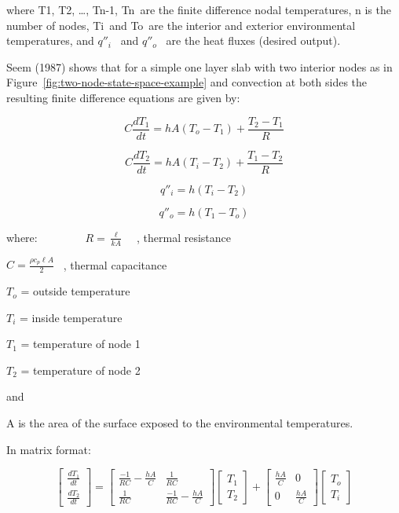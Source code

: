 where T1, T2, \ldots{}, Tn-1, Tn~are the finite difference nodal temperatures, n is the number of nodes, Ti~and To~are the interior and exterior environmental temperatures, and \({q''_i}\) ~and \({q''_o}\) ~are the heat fluxes (desired output).

Seem (1987) shows that for a simple one layer slab with two interior nodes as in Figure~\ref{fig:two-node-state-space-example} and convection at both sides the resulting finite difference equations are given by:

\begin{equation}
C\frac{{d{T_1}}}{{dt}} = hA\left( {{T_o} - {T_1}} \right) + \frac{{{T_2} - {T_1}}}{R}
\end{equation}

\begin{equation}
C\frac{{d{T_2}}}{{dt}} = hA\left( {{T_i} - {T_2}} \right) + \frac{{{T_1} - {T_2}}}{R}
\end{equation}

\begin{equation}
{q''_i} = h\left( {{T_i} - {T_2}} \right)
\end{equation}

\begin{equation}
{q''_o} = h\left( {{T_1} - {T_o}} \right)
\end{equation}

where:~~~~~~~~ \(R = \frac{\ell }{{kA}}\) ~ , thermal resistance

\(C = \frac{{\rho {c_p}\ell A}}{2}\) ~, thermal capacitance

\({T_o}\) = outside temperature

\({T_i}\) = inside temperature

\({T_1}\) = temperature of node 1

\({T_2}\) = temperature of node 2

and

A is the area of the surface exposed to the environmental temperatures.

In matrix format:

\begin{equation}
\left[ {\begin{array}{*{20}{c}}{\frac{{d{T_1}}}{{dt}}}\\ {\frac{{d{T_2}}}{{dt}}}\end{array}} \right] = \left[ {\begin{array}{*{20}{c}}{\frac{{ - 1}}{{RC}} - \frac{{hA}}{C}}&{\frac{1}{{RC}}}\\ {\frac{1}{{RC}}}&{\frac{{ - 1}}{{RC}} - \frac{{hA}}{C}}\end{array}} \right]\left[ {\begin{array}{*{20}{c}}{{T_1}}\\ {{T_2}}\end{array}} \right] + \left[ {\begin{array}{*{20}{c}}{\frac{{hA}}{C}}&0\\0&{\frac{{hA}}{C}}\end{array}} \right]\left[ {\begin{array}{*{20}{c}}{{T_o}}\\ {{T_i}}\end{array}} \right]
\end{equation}

